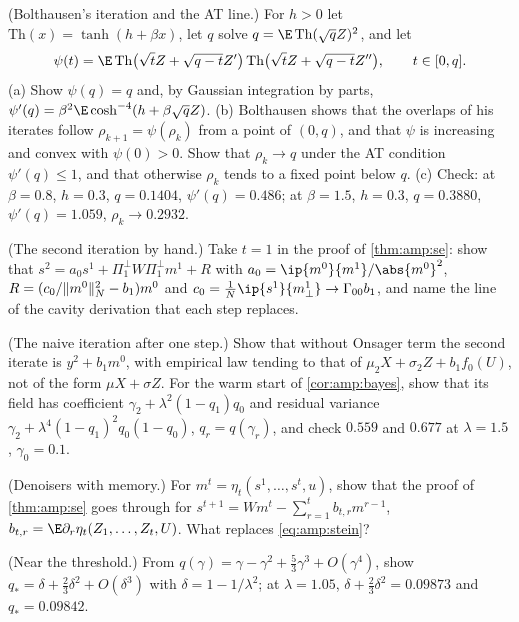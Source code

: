 \begin{refsection}
\begin{exercises}
\item \byhand\hard (Bolthausen's iteration and the AT line.) For $h>0$ let $\mathrm{Th}(x)=\tanh(h+\beta x)$, let $q$ solve $q=\E\,\mathrm{Th}(\sqrt qZ)^2$, and let
\[
\psi(t)=\E\,\mathrm{Th}\bigl(\sqrt tZ+\sqrt{q-t}Z'\bigr)\,\mathrm{Th}\bigl(\sqrt tZ+\sqrt{q-t}Z''\bigr),\qquad t\in[0,q].
\]
(a) Show $\psi(q)=q$ and, by Gaussian integration by parts, $\psi'(q)=\beta^2\E\cosh^{-4}(h+\beta\sqrt qZ)$. (b) Bolthausen shows that the overlaps of his iterates follow $\rho_{k+1}=\psi(\rho_k)$ from a point of $(0,q)$, and that $\psi$ is increasing and convex with $\psi(0)>0$. Show that $\rho_k\to q$ under the AT condition $\psi'(q)\le1$, and that otherwise $\rho_k$ tends to a fixed point below $q$. (c) Check: at $\beta=0.8$, $h=0.3$, $q=0.1404$, $\psi'(q)=0.486$; at $\beta=1.5$, $h=0.3$, $q=0.3880$, $\psi'(q)=1.059$, $\rho_k\to0.2932$. \label{ex:amp:at}

\item \translate (The second iteration by hand.) Take $t=1$ in the proof of \cref{thm:amp:se}: show that $s^2=a_0s^1+\Pi_1^\perp W\Pi_1^\perp m^1+R$ with $a_0=\ip{m^0}{m^1}/\abs{m^0}^2$, $R=(c_0/\lVert m^0\rVert_N^2-b_1)m^0$ and $c_0=\frac1N\ip{s^1}{m^1_\perp}\to\Gamma_{00}b_1$, and name the line of the cavity derivation that each step replaces.\label{ex:amp:second}

\item \translate (The naive iteration after one step.) Show that without Onsager term the second iterate is $y^2+b_1m^0$, with empirical law tending to that of $\mu_2X+\sigma_2Z+b_1f_0(U)$, not of the form $\mu X+\sigma Z$. For the warm start of \cref{cor:amp:bayes}, show that its field has coefficient $\gamma_2+\lambda^2(1-q_1)q_0$ and residual variance $\gamma_2+\lambda^4(1-q_1)^2q_0(1-q_0)$, $q_r=q(\gamma_r)$, and check $0.559$ and $0.677$ at $\lambda=1.5$, $\gamma_0=0.1$.\label{ex:amp:naive}

\item \translate\hard (Denoisers with memory.) For $m^t=\eta_t(s^1,\dots,s^t,u)$, show that the proof of \cref{thm:amp:se} goes through for $s^{t+1}=Wm^t-\sum_{r=1}^tb_{t,r}m^{r-1}$, $b_{t,r}=\E\partial_r\eta_t(Z_1,\dots,Z_t,U)$. What replaces \eqref{eq:amp:stein}?\label{ex:amp:memory}

\item \byhand (Near the threshold.) From $q(\gamma)=\gamma-\gamma^2+\frac53\gamma^3+O(\gamma^4)$, show $q_*=\delta+\frac23\delta^2+O(\delta^3)$ with $\delta=1-1/\lambda^2$; at $\lambda=1.05$, $\delta+\frac23\delta^2=0.09873$ and $q_*=0.09842$.\label{ex:amp:threshold}


\end{exercises}
\end{refsection}
